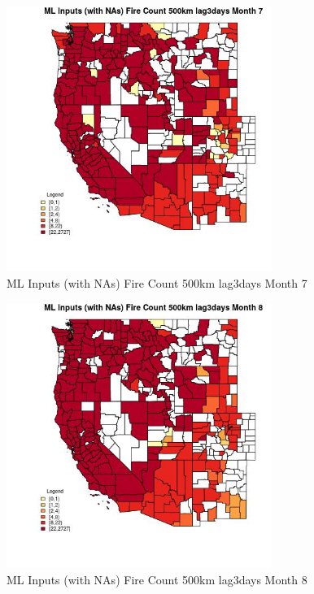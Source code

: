 \begin{figure} 
\centering  
\includegraphics[width=0.77\textwidth]{Code_Outputs/Report_ML_input_PM25_Step4_part_f_de_duplicated_aveswNAs_CountyFire_Count_500km_lag3daysmedianMonth7.jpg} 
\caption{\label{fig:Report_ML_input_PM25_Step4_part_f_de_duplicated_aveswNAsCountyFire_Count_500km_lag3daysmedianMonth7}ML Inputs (with NAs) Fire Count 500km lag3days Month 7} 
\end{figure} 
 

\begin{figure} 
\centering  
\includegraphics[width=0.77\textwidth]{Code_Outputs/Report_ML_input_PM25_Step4_part_f_de_duplicated_aveswNAs_CountyFire_Count_500km_lag3daysmedianMonth8.jpg} 
\caption{\label{fig:Report_ML_input_PM25_Step4_part_f_de_duplicated_aveswNAsCountyFire_Count_500km_lag3daysmedianMonth8}ML Inputs (with NAs) Fire Count 500km lag3days Month 8} 
\end{figure} 
 

